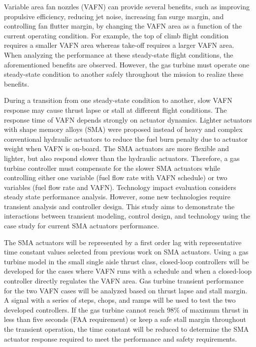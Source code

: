 
Variable area fan nozzles (VAFN) can provide several benefits, such as improving
propulsive efficiency, reducing jet noise, increasing fan surge margin, and 
controlling fan flutter margin, by changing the VAFN area as a function of the 
current operating condition.  For example, the top of climb flight condition 
requires a smaller VAFN area whereas take-off requires a larger VAFN area. 
When analyzing the performance at these steady-state flight conditions, 
the aforementioned benefits are observed.  However, the gas turbine must 
operate one steady-state condition to another safely throughout the mission to 
realize these benefits. 

During a transition from one steady-state condition to another, slow VAFN 
response may cause thrust lapse or stall at different flight conditions. The 
response time of VAFN depends strongly on actuator dynamics. Lighter actuators
with shape memory alloys (SMA) were proposed instead of heavy and complex 
conventional hydraulic actuators to reduce the fuel burn penalty due to actuator
weight when VAFN is on-board. The SMA actuators are more flexible and lighter, 
but also respond slower than the hydraulic actuators. Therefore, a gas turbine 
controller must compensate for the slower SMA actuators while controlling either 
one variable (fuel flow rate with VAFN schedule) or two variables (fuel flow rate 
and VAFN). Technology impact evaluation considers steady state performance 
analysis. However, some new technologies require transient analysis and 
controller design. This study aims to demonstrate the interactions between 
transient modeling, control design, and technology using the case study for 
current SMA actuators performance.

The SMA actuators will be represented by a first order lag with representative 
time constant values selected from previous work on SMA actuators. Using a gas
turbine model in the small single aisle thrust class, closed-loop controllers will be
developed for the cases where VAFN runs with a schedule and when a 
closed-loop controller directly regulates the VAFN area. Gas turbine transient 
performance for the two VAFN cases will be analyzed based on thrust lapse and 
stall margin. A signal with a series of steps, chops, and ramps will be used to 
test the two developed controllers. If the gas turbine cannot reach 98\% of 
maximum thrust in less than five seconds (FAA requirement) or keep a safe stall 
margin throughout the transient operation, the time constant will be reduced to 
determine the SMA actuator response required to meet the performance and 
safety requirements.